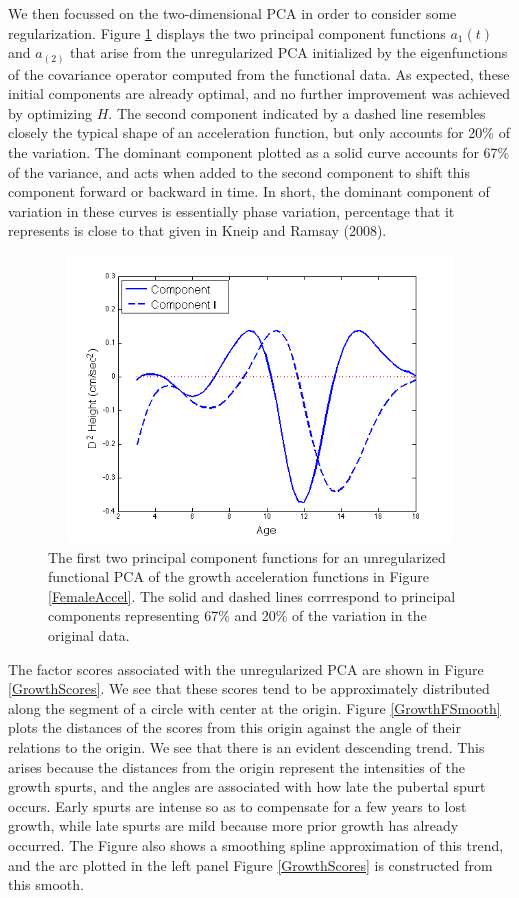 \documentclass[12pt]{article}
\begin{document}
We then focussed on the two-dimensional PCA in order to consider some regularization.  Figure \ref{GrowthComponent_0} displays the two principal component functions $a_1(t)$ and $a_(2)$ that arise from the unregularized PCA initialized  by the eigenfunctions of the covariance operator computed from the functional data.  As expected, these initial components are already optimal, and no further improvement was achieved by optimizing $H$.  The second component indicated by a dashed line resembles closely the typical shape of an acceleration function, but only accounts for 20\% of the variation.  The dominant component plotted as a solid curve accounts for 67\% of the variance, and acts when added to the second component to shift this component forward or backward in time.  In short, the dominant component of variation in these curves is essentially phase variation, percentage that it represents is close to that given in Kneip and Ramsay (2008).  

\begin{figure}
  \includegraphics[height=3in, width=5in]{figs/GrowthComponent_0}
  \caption{The first two principal component functions for an unregularized functional PCA of the growth acceleration functions in Figure \ref{FemaleAccel}.  The solid and dashed lines corrrespond to principal components representing 67\% and 20\% of the variation in the original data.}
  \label{GrowthComponent_0}
\end{figure}

The factor scores associated with the unregularized PCA are shown in Figure \ref{GrowthScores}.  We see that these scores tend to be approximately distributed along the segment of a circle with center at the origin.  Figure \ref{GrowthFSmooth} plots the distances of the scores from this origin against the angle of their relations to the origin.  We see that there is an evident descending trend.  This arises because the distances from the origin represent the intensities of the growth spurts, and the angles are associated with how late the pubertal spurt occurs.  Early spurts are intense so as to compensate for a few years to lost growth, while late spurts are mild because more prior growth has already occurred.  The Figure also shows a smoothing spline approximation of this trend, and the arc plotted in the left panel Figure \ref{GrowthScores} is constructed from this smooth.
\end{document}
